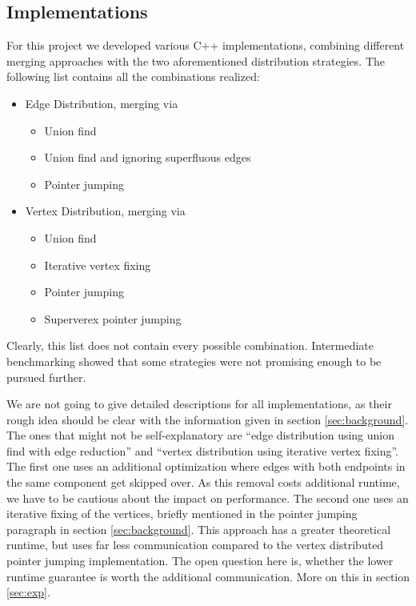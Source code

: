 \documentclass[letterpaper]{article}
\begin{document}
\subsection{Implementations}
For this project we developed various C++ implementations, combining different merging approaches with the two
aforementioned distribution strategies. The following list contains all the combinations realized:
\begin{itemize}
  \item Edge Distribution, merging via
  \begin{itemize}
     \item Union find 
     \item Union find and ignoring superfluous edges
     \item Pointer jumping
  \end{itemize}
  \item Vertex Distribution, merging via
  \begin{itemize}
     \item Union find 
     \item Iterative vertex fixing
     \item Pointer jumping
     \item Superverex pointer jumping
  \end{itemize}
\end{itemize}
Clearly, this list does not contain every possible combination. Intermediate benchmarking showed that some strategies
were not promising enough to be pursued further.

We are not going to give detailed descriptions for all implementations, as their rough idea should be clear with the
information given in section \ref{sec:background}. The ones that might not be self-explanatory are ``edge distribution
using union find with edge reduction'' and ``vertex distribution using iterative vertex fixing''. The first one uses an
additional optimization where edges with both endpoints in the same component get skipped over. As this removal costs
additional runtime, we have to be cautious about the impact on performance. The second one uses an iterative fixing of
the vertices, briefly mentioned in the pointer jumping paragraph in section \ref{sec:background}. This approach has a
greater theoretical runtime, but uses far less communication compared to the vertex distributed pointer jumping
implementation. The open question here is, whether the lower runtime guarantee is worth the additional communication.
More on this in section \ref{sec:exp}. %
\end{document}

